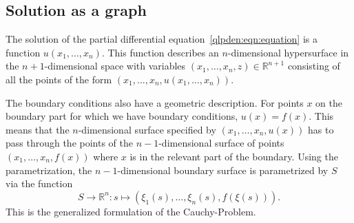 \subsection{Solution as a graph}
The solution of the partial differential equation~\eqref{qlpden:eqn:equation}
is a function  $u(x_1,\dots,x_n)$.
This function describes an $n$-dimensional hypersurface in the
$n+1$-dimensional space with
variables $(x_1,\dots,x_n,z)\in\mathbb{R}^{n+1}$ consisting of all the
points of the form $(x_1,\dots,x_n,u(x_1,\dots,x_n))$.

The boundary conditions also have a geometric description.
For points $x$ on the boundary part for which we have boundary conditions,
$u(x)=f(x)$.
This means that the $n$-dimensional surface specified by
$(x_1,\dots,x_n,u(x))$ has to pass through the points of the $n-1$-dimensional
surface of points $(x_1,\dots,x_n,f(x))$ where $x$ is in the relevant
part of the boundary.
Using the parametrization, the $n-1$-dimensional boundary surface is
parametrized by $S$ via the function
\[
S\to \mathbb{R}^n
:
s\mapsto (\xi_1(s), \dots,\xi_n(s), f(\xi(s))).
\]
This is the generalized formulation of the Cauchy-Problem.

